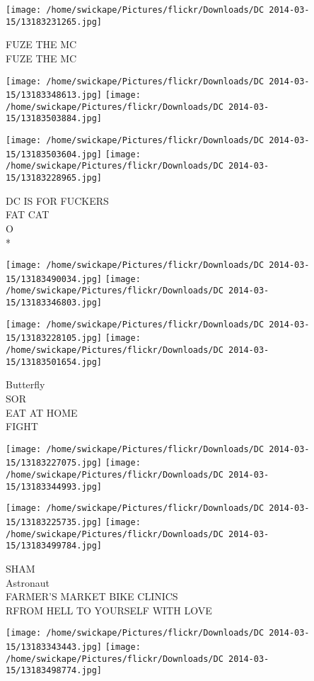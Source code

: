 \documentclass[10pt,letterpaper]{article}
\begin{document}
\vspace{0.25in}
\texttt{[image: /home/swickape/Pictures/flickr/Downloads/DC 2014-03-15/13183231265.jpg]}

FUZE THE MC\\
FUZE THE MC
\pagebreak

\texttt{[image: /home/swickape/Pictures/flickr/Downloads/DC 2014-03-15/13183348613.jpg]}
\texttt{[image: /home/swickape/Pictures/flickr/Downloads/DC 2014-03-15/13183503884.jpg]}

\texttt{[image: /home/swickape/Pictures/flickr/Downloads/DC 2014-03-15/13183503604.jpg]}
\texttt{[image: /home/swickape/Pictures/flickr/Downloads/DC 2014-03-15/13183228965.jpg]}

DC IS FOR FUCKERS\\
FAT CAT\\
O\\
*
\pagebreak

\texttt{[image: /home/swickape/Pictures/flickr/Downloads/DC 2014-03-15/13183490034.jpg]}
\texttt{[image: /home/swickape/Pictures/flickr/Downloads/DC 2014-03-15/13183346803.jpg]}

\texttt{[image: /home/swickape/Pictures/flickr/Downloads/DC 2014-03-15/13183228105.jpg]}
\texttt{[image: /home/swickape/Pictures/flickr/Downloads/DC 2014-03-15/13183501654.jpg]}

Butterfly\\
SOR\\
EAT AT HOME\\
FIGHT
\pagebreak

\texttt{[image: /home/swickape/Pictures/flickr/Downloads/DC 2014-03-15/13183227075.jpg]}
\texttt{[image: /home/swickape/Pictures/flickr/Downloads/DC 2014-03-15/13183344993.jpg]}

\texttt{[image: /home/swickape/Pictures/flickr/Downloads/DC 2014-03-15/13183225735.jpg]}
\texttt{[image: /home/swickape/Pictures/flickr/Downloads/DC 2014-03-15/13183499784.jpg]}

SHAM\\
Astronaut\\
FARMER'S MARKET BIKE CLINICS\\
RFROM HELL TO YOURSELF WITH LOVE
\pagebreak

\texttt{[image: /home/swickape/Pictures/flickr/Downloads/DC 2014-03-15/13183343443.jpg]}
\texttt{[image: /home/swickape/Pictures/flickr/Downloads/DC 2014-03-15/13183498774.jpg]}
\end{document}

